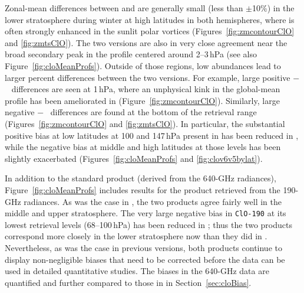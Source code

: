 Zonal-mean differences between \prevv and \thisv {} are generally small (less than $\pm$10\%) in the lower stratosphere during winter at high latitudes in both hemispheres, where  is often strongly enhanced in the sunlit polar vortices (Figures~\ref{fig:zmcontourClO} and \ref{fig:zmtsClO}). The two versions are also in very close agreement near the broad secondary peak in the  profile centered around 2--3\,hPa (see also Figure~\ref{fig:cloMeanProfs}). Outside of those regions, low  abundances lead to larger percent differences between the two versions. For example, large positive \mbox{\thisv $-$ \prevv} differences are seen at 1\,hPa, where an unphysical kink in the \prevv global-mean profile has been ameliorated in \thisv (Figure~\ref{fig:zmcontourClO}). Similarly, large negative \mbox{\thisv $-$ \prevv} differences are found at the bottom of the retrieval range (Figures~\ref{fig:zmcontourClO} and \ref{fig:zmtsClO}). In particular, the substantial positive bias at low latitudes at 100 and 147\,hPa present in \prevv has been reduced in \thisv, while the negative bias at middle and high latitudes at those levels has been slightly exacerbated (Figures~\ref{fig:cloMeanProfs} and \ref{fig:clov6v5bylat}).

In addition to the standard product (derived from the \mbox{640\nobreakdash-GHz} radiances), Figure~\ref{fig:cloMeanProfs} includes results for the  product retrieved from the \mbox{190\nobreakdash-GHz} radiances. As was the case in \prevv, the two \thisv {} products agree fairly well in the middle and upper stratosphere. The very large negative bias in \texttt{ClO-190} at its lowest retrieval levels (68--100\,hPa) has been reduced in \thisv; thus the two  products correspond more closely in the lower stratosphere now than they did in \prevv. Nevertheless, as was the case in previous versions, both  products continue to display non-negligible biases that need to be corrected before the data can be used in detailed quantitative studies. The biases in the \thisv \mbox{640\nobreakdash-GHz}  data are quantified and further compared to those in \prevv in Section~\ref{sec:cloBias}.

